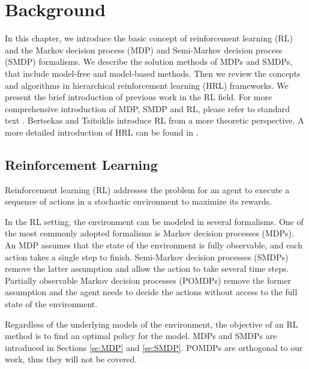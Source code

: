 \chapter{Background}
\label{ch:RL}

In this chapter, we introduce the basic concept of reinforcement learning (RL)
and the Markov decision process (MDP) and Semi-Markov decision process (SMDP) formalisms.
We describe the solution methods of MDPs and SMDPs, that include model-free and model-based 
methods. Then we review the concepts and algorithms in hierarchical reinforcement learning (HRL) frameworks. 
We present the brief introduction of previous work in the RL field.
For more comprehensive introduction of MDP, SMDP and RL, please refer to standard text
\cite{howard1960, Puterman94, SuttonIntro, KevinIntro}.
Bertsekas and Tsitsiklis \cite{Neurodynamic} introduce RL from a more theoretic perspective.
A more detailed introduction of HRL can be found in \cite{HRLSurvey}.

\section{Reinforcement Learning}
Reinforcement learning (RL) addresses the problem for an agent to execute a sequence of actions
in a stochastic environment to maximize its rewards. 

In the RL setting, the environment can be modeled in several formalisms.
One of the most commonly adopted formalisms is Markov decision processes (MDPs).
An MDP assumes that the state of the environment is fully observable, and each action takes a single
step to finish. Semi-Markov decision processes (SMDPs) remove the latter assumption and allow
the action to take several time steps. Partially observable Markov decision processes (POMDPs) remove
the former assumption and the agent needs to decide the actions without access to the full state
of the environment.

Regardless of the underlying models of the environment, the objective of an RL method is
to find an optimal policy for the model. MDPs and SMDPs are introduced in Sections \ref{se:MDP} and \ref{se:SMDP}.
POMDPs are orthogonal to our work, thus they will not be covered.

